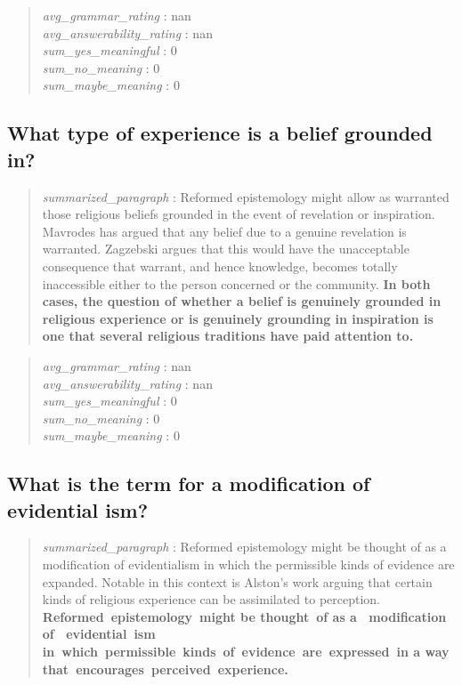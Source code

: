 \begin{quote}
\emph{avg\_grammar\_rating} : nan\\
\emph{avg\_answerability\_rating} : nan\\
\emph{sum\_yes\_meaningful} : 0\\
\emph{sum\_no\_meaning} : 0\\
\emph{sum\_maybe\_meaning} : 0
\end{quote}

\hypertarget{what-type-of-experience-is-a-belief-grounded-in}{%
\subsection{What type of experience is a belief grounded
in?}\label{what-type-of-experience-is-a-belief-grounded-in}}

\begin{quote}
\emph{summarized\_paragraph} : Reformed epistemology might allow as
warranted those religious beliefs grounded in the event of revelation or
inspiration. Mavrodes has argued that any belief due to a genuine
revelation is warranted. Zagzebski argues that this would have the
unacceptable consequence that warrant, and hence knowledge, becomes
totally inaccessible either to the person concerned or the community.
\textbf{In both cases, the question of whether a belief is genuinely
grounded in religious experience or is genuinely grounding in
inspiration is one that several religious traditions have paid attention
to.}
\end{quote}

\begin{quote}
\emph{avg\_grammar\_rating} : nan\\
\emph{avg\_answerability\_rating} : nan\\
\emph{sum\_yes\_meaningful} : 0\\
\emph{sum\_no\_meaning} : 0\\
\emph{sum\_maybe\_meaning} : 0
\end{quote}

\hypertarget{what-is-the-term-for-a-modification-of-evidential-ism}{%
\subsection{What is the term for a modification of evidential
ism?}\label{what-is-the-term-for-a-modification-of-evidential-ism}}

\begin{quote}
\emph{summarized\_paragraph} : Reformed epistemology might be thought of
as a modification of evidentialism in which the permissible kinds of
evidence are expanded. Notable in this context is Alston's work arguing
that certain kinds of religious experience can be assimilated to
perception. \textbf{Reformed~epistemology~might be thought~of as a~
modification of~ evidential~ism
in~which~permissible~kinds~of~evidence~are~expressed~in a way
that~encourages~perceived~experience.}
\end{quote}


